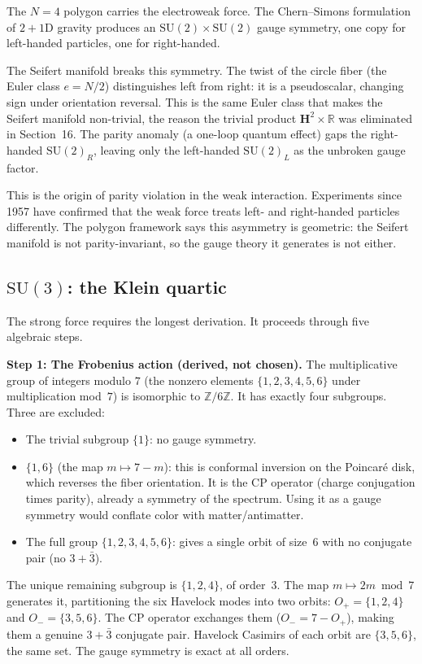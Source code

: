 The $N = 4$ polygon carries the electroweak force. The Chern--Simons
formulation of $2+1$D gravity produces an $\mathrm{SU}(2) \times
\mathrm{SU}(2)$ gauge symmetry, one copy for left-handed particles,
one for right-handed.

The Seifert manifold breaks this symmetry. The twist of the circle
fiber (the Euler class $e = N/2$) distinguishes left from right: it is
a pseudoscalar, changing sign under orientation reversal. This is
the same Euler class that makes the Seifert manifold non-trivial, the
reason the trivial product $\mathbf{H}^2 \times \mathbb{R}$ was
eliminated in Section~16. The parity anomaly (a one-loop quantum
effect) gaps the right-handed $\mathrm{SU}(2)_R$, leaving only the
left-handed $\mathrm{SU}(2)_L$ as the unbroken gauge factor.

This is the origin of parity violation in the weak interaction.
Experiments since 1957 have confirmed that the weak force treats left-
and right-handed particles differently. The polygon framework says
this asymmetry is geometric: the Seifert manifold is not
parity-invariant, so the gauge theory it generates is not either.

\subsection*{$\mathrm{SU}(3)$: the Klein quartic}

The strong force requires the longest derivation. It proceeds
through five algebraic steps.

\textbf{Step 1: The Frobenius action (derived, not chosen).}
The multiplicative group of integers modulo $7$ (the nonzero
elements $\{1, 2, 3, 4, 5, 6\}$ under multiplication mod~$7$)
is isomorphic to $\mathbb{Z}/6\mathbb{Z}$. It has exactly four
subgroups. Three are excluded:
\begin{itemize}
\item The trivial subgroup $\{1\}$: no gauge symmetry.
\item $\{1, 6\}$ (the map $m \mapsto 7-m$): this is conformal
  inversion on the Poincar\'e disk, which reverses the fiber
  orientation. It is the CP operator (charge conjugation times
  parity), already a symmetry of the spectrum. Using it as a
  gauge symmetry would conflate color with matter/antimatter.
\item The full group $\{1,2,3,4,5,6\}$: gives a single orbit
  of size~$6$ with no conjugate pair (no $3 + \bar{3}$).
\end{itemize}
The unique remaining subgroup is $\{1, 2, 4\}$, of order~$3$.
The map $m \mapsto 2m \bmod 7$ generates it, partitioning the
six Havelock modes into two orbits:
$O_+ = \{1, 2, 4\}$ and $O_- = \{3, 5, 6\}$.
The CP operator exchanges them ($O_- = 7 - O_+$), making
them a genuine $3 + \bar{3}$ conjugate pair.
Havelock Casimirs of each orbit are $\{3, 5, 6\}$, the
same set. The gauge symmetry is exact at all orders.

